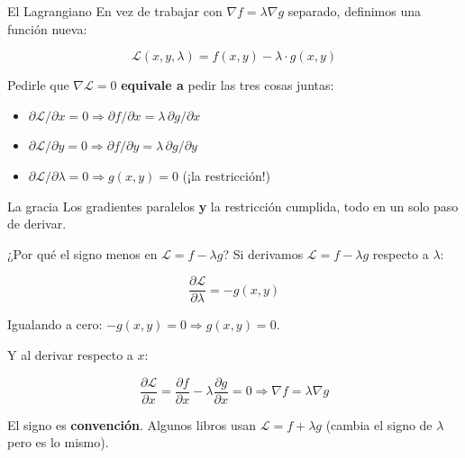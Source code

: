 \documentclass{beamer}
\begin{document}
\begin{frame}{El Lagrangiano}
    \small
    En vez de trabajar con $\nabla f = \lambda \nabla g$ separado, definimos una función nueva:

    \[
    \mathcal{L}(x, y, \lambda) = f(x, y) - \lambda \cdot g(x, y)
    \]

    \vspace{0.5em}

    Pedirle que $\nabla \mathcal{L} = 0$ \textbf{equivale a} pedir las tres cosas juntas:

    \begin{itemize}
        \item $\partial \mathcal{L} / \partial x = 0 \Rightarrow \partial f / \partial x = \lambda \, \partial g / \partial x$
        \item $\partial \mathcal{L} / \partial y = 0 \Rightarrow \partial f / \partial y = \lambda \, \partial g / \partial y$
        \item $\partial \mathcal{L} / \partial \lambda = 0 \Rightarrow g(x, y) = 0$ (¡la restricción!)
    \end{itemize}

    \vspace{0.5em}

    \begin{alertblock}{La gracia}
        Los gradientes paralelos \textbf{y} la restricción cumplida, todo en un solo paso de derivar.
    \end{alertblock}
\end{frame}

\begin{frame}{¿Por qué el signo menos en $\mathcal{L} = f - \lambda g$?}
    \small
    Si derivamos $\mathcal{L} = f - \lambda g$ respecto a $\lambda$:

    \[
    \frac{\partial \mathcal{L}}{\partial \lambda} = -g(x, y)
    \]

    Igualando a cero: $-g(x, y) = 0 \Rightarrow g(x, y) = 0$. \checkmark

    \vspace{0.8em}

    Y al derivar respecto a $x$:

    \[
    \frac{\partial \mathcal{L}}{\partial x} = \frac{\partial f}{\partial x} - \lambda \frac{\partial g}{\partial x} = 0 \Rightarrow \nabla f = \lambda \nabla g
    \]

    \vspace{0.5em}

    El signo es \textbf{convención}. Algunos libros usan $\mathcal{L} = f + \lambda g$ (cambia el signo de $\lambda$ pero es lo mismo).
\end{frame}
\end{document}
